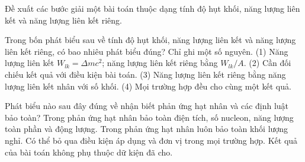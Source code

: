\begin{bt}
Đề xuất các bước giải một bài toán thuộc dạng tính độ hụt khối, năng lượng liên kết và năng lượng liên kết riêng.
\end{bt}

\begin{ex}
Trong bốn phát biểu sau về tính độ hụt khối, năng lượng liên kết và năng lượng liên kết riêng, có bao nhiêu phát biểu đúng? Chỉ ghi một số nguyên. (1) Năng lượng liên kết $W_{lk}=\Delta m c^2$; năng lượng liên kết riêng bằng $W_{lk}/A$. (2) Cần đối chiếu kết quả với điều kiện bài toán. (3) Năng lượng liên kết riêng bằng năng lượng liên kết nhân với số khối. (4) Mọi trường hợp đều cho cùng một kết quả.
\end{ex}

\begin{ex}
Phát biểu nào sau đây đúng về nhận biết phản ứng hạt nhân và các định luật bảo toàn?
\choice
{\True Trong phản ứng hạt nhân bảo toàn điện tích, số nucleon, năng lượng toàn phần và động lượng.}
{Trong phản ứng hạt nhân luôn bảo toàn khối lượng nghỉ.}
{Có thể bỏ qua điều kiện áp dụng và đơn vị trong mọi trường hợp.}
{Kết quả của bài toán không phụ thuộc dữ kiện đã cho.}
\end{ex}

